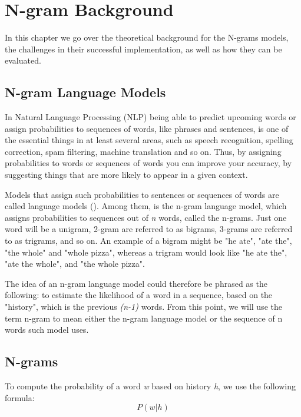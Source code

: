 \chapter{N-gram Background}
\label{chap:NgramBackground}

In this chapter we go over the theoretical background for the N-grams models, the challenges in their successful implementation, as well as how they can be evaluated.

\section{N-gram Language Models}
\label{sec:NgramBackground-LanguageModels}
In Natural Language Processing (NLP) being able to predict upcoming words or assign probabilities to sequences of words, like phrases and sentences, is one of the essential things in at least several areas, such as speech recognition, spelling correction, spam filtering, machine translation and so on. Thus, by assigning probabilities to words or sequences of words you can improve your accuracy, by suggesting things that are more likely to appear in a given context.

Models that assign such probabilities to sentences or sequences of words are called language models (\cite{Jura09a}). Among them, is the n-gram language model, which assigns probabilities to sequences out of \textit{n} words, called the n-grams. Just one word will be a unigram, 2-gram are referred to as bigrams, 3-grams are referred to as trigrams, and so on. An example of a bigram might be "he ate", "ate the", "the whole" and "whole pizza", whereas a trigram would look like "he ate the", "ate the whole", and "the whole pizza". 

The idea of an n-gram language model could therefore be phrased as the following: to estimate the likelihood of a word in a sequence, based on the "history", which is the previous \textit{(n-1)} words. From this point, we will use the term n-gram to mean either the n-gram language model or the sequence of n words such model uses.

\section{N-grams}
\label{sec:NgramBackground-Ngrams}
To compute the probability of a word \textit{w} based on history \textit{h}, we use the following formula:
\begin{equation}
    P(w|h)
\end{equation}

